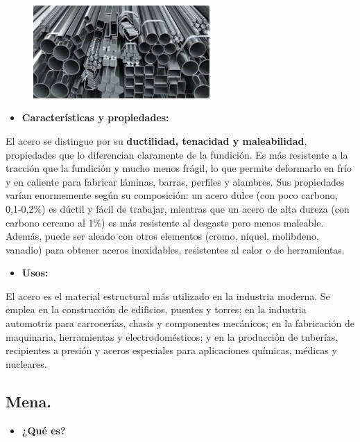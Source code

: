 \documentclass[12pt,a4paper]{article}
\begin{document}
\begin{figure}[H]    
    \centering         
    \includegraphics[width=0.6\textwidth]{Inagenes para latex/Acero.jpeg}
\end{figure}
\begin{itemize}
    \item \textbf{Características y propiedades:} 
\end{itemize}

El acero se distingue por su \textbf{ductilidad, tenacidad y maleabilidad}, propiedades que lo diferencian claramente de la fundición. Es más resistente a la tracción que la fundición y mucho menos frágil, lo que permite deformarlo en frío y en caliente para fabricar láminas, barras, perfiles y alambres. Sus propiedades varían enormemente según su composición: un acero dulce (con poco carbono, 0,1-0,2\%) es dúctil y fácil de trabajar, mientras que un acero de alta dureza (con carbono cercano al 1\%) es más resistente al desgaste pero menos maleable. Además, puede ser aleado con otros elementos (cromo, níquel, molibdeno, vanadio) para obtener aceros inoxidables, resistentes al calor o de herramientas.

\begin{itemize}
    \item \textbf{Usos:}
\end{itemize}

El acero es el material estructural más utilizado en la industria moderna. Se emplea en la construcción de edificios, puentes y torres; en la industria automotriz para carrocerías, chasis y componentes mecánicos; en la fabricación de maquinaria, herramientas y electrodomésticos; y en la producción de tuberías, recipientes a presión y aceros especiales para aplicaciones químicas, médicas y nucleares.

\subsection{Mena.}
\begin{itemize}
    \item \textbf{¿Qué es?}
\end{itemize}
\end{document}
